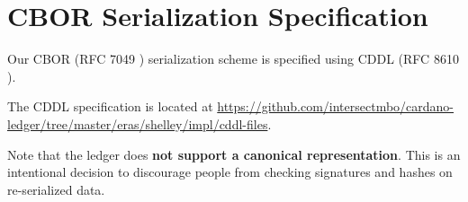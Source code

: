 \section{CBOR Serialization Specification}
\label{sec:cddl}

Our CBOR (RFC 7049 \cite{rfcCBOR})
serialization scheme is specified using
CDDL (RFC 8610 \cite{rfcCDDL}).

The CDDL specification is located at
\url{https://github.com/intersectmbo/cardano-ledger/tree/master/eras/shelley/impl/cddl-files}.

% 

Note that the ledger does
\textbf{not support a canonical representation}.
This is an intentional decision to discourage people from
checking signatures and hashes on re-serialized data.
